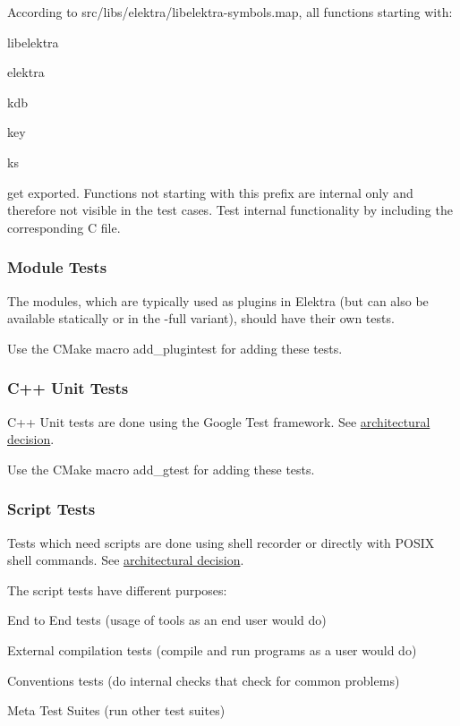 According to {\ttfamily src/libs/elektra/libelektra-\/symbols.\+map}, all functions starting with\+:


\begin{DoxyItemize}
\item libelektra
\item elektra
\item kdb
\item key
\item ks
\end{DoxyItemize}

get exported. Functions not starting with this prefix are internal only and therefore not visible in the test cases. Test internal functionality by including the corresponding C file.

\subsubsection*{Module Tests}

The modules, which are typically used as plugins in Elektra (but can also be available statically or in the {\ttfamily -\/full} variant), should have their own tests.

Use the C\+Make macro {\ttfamily add\+\_\+plugintest} for adding these tests.

\subsubsection*{C++ Unit Tests}

C++ Unit tests are done using the Google Test framework. See \hyperlink{doc_decisions_unit_testing_md}{architectural decision}.

Use the C\+Make macro {\ttfamily add\+\_\+gtest} for adding these tests.

\subsubsection*{Script Tests}

Tests which need scripts are done using shell recorder or directly with P\+O\+S\+IX shell commands. See \hyperlink{doc_decisions_script_testing_md}{architectural decision}.

The script tests have different purposes\+:


\begin{DoxyItemize}
\item End to End tests (usage of tools as an end user would do)
\item External compilation tests (compile and run programs as a user would do)
\item Conventions tests (do internal checks that check for common problems)
\item Meta Test Suites (run other test suites)
\end{DoxyItemize}

